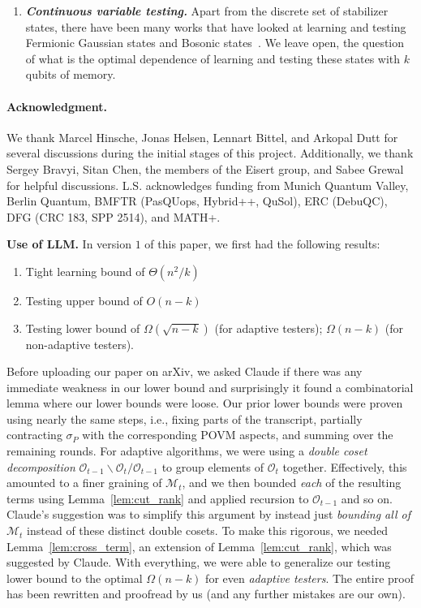 \documentclass[11pt]{article}
\newcommand{\Oc}{\mathcal{O}}
\newcommand{\Mc}{\mathcal{M}}
\begin{document}
\begin{enumerate}
    \item \emph{\textbf{Continuous variable testing.}} Apart from the discrete set of stabilizer states, there have been many works that have looked at learning and testing Fermionic Gaussian states and Bosonic states~\cite{bittel2025optimal,mele2025efficient,mele2026quantum}. We leave open, the question of what is the optimal dependence of learning and testing these states with $k$ qubits of memory.
\end{enumerate}


\paragraph{Acknowledgment.} We thank  Marcel Hinsche, Jonas Helsen, Lennart Bittel, and Arkopal Dutt for several discussions during the initial stages of this project. Additionally, we thank Sergey Bravyi, Sitan Chen, the members of the Eisert group, and Sabee Grewal for helpful discussions. L.S. acknowledges funding from Munich Quantum Valley, Berlin Quantum, BMFTR (PasQUops, Hybrid++, QuSol), ERC (DebuQC), DFG (CRC 183, SPP 2514), and MATH+.

\noindent \textbf{Use of LLM.} In version $1$ of this paper, we first had the following results: 
\begin{enumerate}[label=$(\roman*)$,itemsep=0.5pt]
    \item Tight learning bound of $\Theta(n^2/k)$
    \item Testing upper bound of $O(n-k)$ 
    \item Testing lower bound of $\Omega(\sqrt{n-k})$ (for adaptive testers); $\Omega(n-k)$ (for non-adaptive testers).
\end{enumerate}  
Before uploading our paper on arXiv, we asked  Claude if there was any immediate weakness in our lower bound  and surprisingly it found a combinatorial lemma where our lower bounds were loose. Our prior lower bounds were proven using nearly the same steps, i.e., fixing parts of the transcript, partially contracting $\sigma_P$ with the corresponding POVM aspects, and summing over the remaining rounds. For adaptive algorithms, we were using a \emph{double coset decomposition} $\Oc_{t-1} \backslash \Oc_{t} / \Oc_{t-1}$ to group elements of $\Oc_{t}$ together. Effectively, this amounted to a finer graining of $\Mc_t$, and we then bounded \emph{each} of the resulting terms using Lemma~\ref{lem:cut_rank} and applied recursion to $\Oc_{t-1}$ and so on. Claude's suggestion was to simplify this argument by instead just \emph{bounding all of $\mathcal M_t$} instead of these distinct double cosets. To make this rigorous, we needed Lemma~\ref{lem:cross_term}, an extension of Lemma~\ref{lem:cut_rank}, which was suggested by Claude. With everything, we were able to generalize our testing lower bound to the optimal $\Omega(n-k)$ for even \emph{adaptive testers}. The entire proof has been rewritten and proofread by us (and any further mistakes are our own). 
\end{document}
